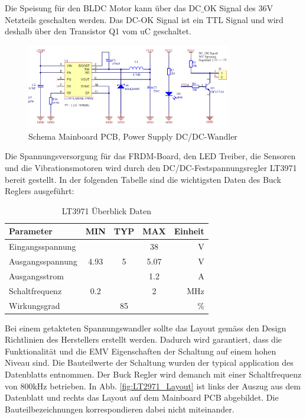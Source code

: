 Die Speisung für den BLDC Motor kann über das DC$\_$OK Signal des 36V Netzteils geschalten werden. Das DC-OK Signal ist ein TTL Signal und wird deshalb über den Transistor Q1 vom uC geschaltet.

\begin{figure}[H]
	\includegraphics[width=0.8\textwidth]{Illustrationen/6-Umsetzung/Schema_Mainboard_PowerSupply_2.png}
	\caption{Schema Mainboard PCB, Power Supply DC/DC-Wandler}
	\label{fig:Schema_Mainboard_PowerSupply_2}
\end{figure}


Die Spannungsversorgung für das FRDM-Board, den LED Treiber, die Sensoren und die Vibrationsmotoren wird durch den DC/DC-Festspannungsregler LT3971 bereit gestellt. In der folgenden Tabelle sind die wichtigsten Daten des Buck Reglers ausgeführt:

\begin{table}[htbp]
	\small
	\centering
	\caption{LT3971 Überblick Daten \protect\cite{LT3971_Datasheet}}
	\begin{tabular}{|l|ccc|r|}
		\hline
		\textbf{Parameter} & \multicolumn{1}{l}{\textbf{MIN}} & \multicolumn{1}{l}{\textbf{TYP}} & \multicolumn{1}{l}{\textbf{MAX}} & \textbf{Einheit} \\
		\hline
		Eingangsspannung &       &       & 38    & V \\
		\hline
		Ausgangsspannung & 4.93  & 5     & 5.07  & V \\
		\hline
		Ausgangsstrom &       &       & 1.2   & A \\
		\hline
		Schaltfrequenz & 0.2   &       & 2     & MHz \\
		\hline
		Wirkungsgrad &       & 85    &       & \% \\
		\hline
	\end{tabular}%
	\label{tab:LT3971_Datasheet}%
\end{table}%

Bei einem getakteten Spannungswandler sollte das Layout gemäss den Design Richtlinien des Herstellers erstellt werden. Dadurch wird garantiert, dass die Funktionalität und die EMV Eigenschaften der Schaltung auf einem hohen Niveau sind. Die Bauteilwerte der Schaltung wurden der typical application des Datenblatts entnommen. Der Buck Regler wird demanch mit einer Schaltfrequenz von 800kHz betrieben. In Abb. \ref{fig:LT2971_Layout} ist links der Auszug aus dem Datenblatt und rechts das Layout auf dem Mainboard PCB abgebildet. Die Bauteilbezeichnungen korrespondieren dabei nicht miteinander.

